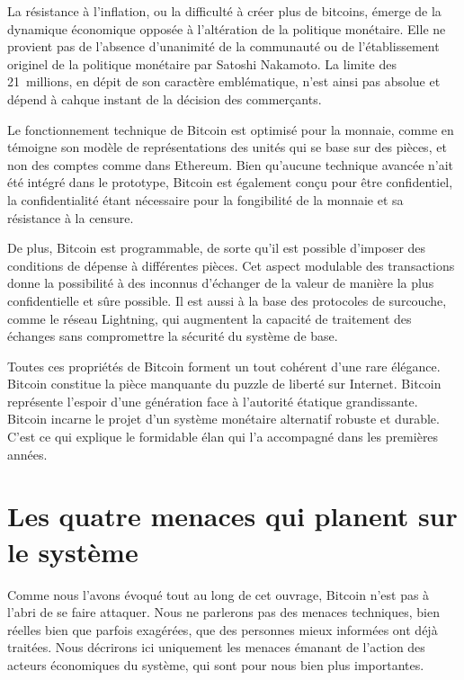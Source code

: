 La résistance à l'inflation, ou la difficulté à créer plus de bitcoins, émerge de la dynamique économique opposée à l'altération de la politique monétaire. Elle ne provient pas de l'absence d'unanimité de la communauté ou de l'établissement originel de la politique monétaire par Satoshi Nakamoto. La limite des 21~millions, en dépit de son caractère emblématique, n'est ainsi pas absolue et dépend à cahque instant de la décision des commerçants.

Le fonctionnement technique de Bitcoin est optimisé pour la monnaie, comme en témoigne son modèle de représentations des unités qui se base sur des pièces, et non des comptes comme dans Ethereum. Bien qu'aucune technique avancée n'ait été intégré dans le prototype, Bitcoin est également conçu pour être confidentiel, la confidentialité étant nécessaire pour la fongibilité de la monnaie et sa résistance à la censure.

De plus, Bitcoin est programmable, de sorte qu'il est possible d'imposer des conditions de dépense à différentes pièces. Cet aspect modulable des transactions donne la possibilité à des inconnus d'échanger de la valeur de manière la plus confidentielle et sûre possible. Il est aussi à la base des protocoles de surcouche, comme le réseau Lightning, qui augmentent la capacité de traitement des échanges sans compromettre la sécurité du système de base.

Toutes ces propriétés de Bitcoin forment un tout cohérent d'une rare élégance. Bitcoin constitue la pièce manquante du puzzle de liberté sur Internet. Bitcoin représente l'espoir d'une génération face à l'autorité étatique grandissante. Bitcoin incarne le projet d'un système monétaire alternatif robuste et durable. C'est ce qui explique le formidable élan qui l'a accompagné dans les premières années.


\section*{Les quatre menaces qui planent sur le système}

Comme nous l'avons évoqué tout au long de cet ouvrage, Bitcoin n'est pas à l'abri de se faire attaquer. Nous ne parlerons pas des menaces techniques, bien réelles bien que parfois exagérées, que des personnes mieux informées ont déjà traitées. Nous décrirons ici uniquement les menaces émanant de l'action des acteurs économiques du système, qui sont pour nous bien plus importantes.

